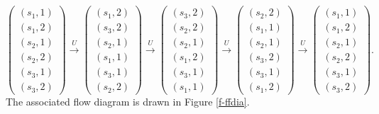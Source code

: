 $$
\left(
\begin{array}{c}
(s_1,1)                \\
(s_1,2)                \\
(s_2,1)                \\
(s_2,2)                \\
(s_3,1)                \\
(s_3,2)
\end{array}
\right)
\stackrel{U}{\longrightarrow }
\left(
\begin{array}{c}
(s_1,2)                \\
(s_3,2)                \\
(s_2,1)                \\
(s_1,1)                \\
(s_3,1)                \\
(s_2,2)
\end{array}
\right)
\stackrel{U}{\longrightarrow }
\left(
\begin{array}{c}
(s_3,2)                \\
(s_2,2)                \\
(s_2,1)                \\
(s_1,2)                \\
(s_3,1)                \\
(s_1,1)
\end{array}
\right)
\stackrel{U}{\longrightarrow }
\left(
\begin{array}{c}
(s_2,2)                \\
(s_1,1)                \\
(s_2,1)                \\
(s_3,2)                \\
(s_3,1)                \\
(s_1,2)
\end{array}
\right)
\stackrel{U}{\longrightarrow }
\left(
\begin{array}{c}
(s_1,1)                \\
(s_1,2)                \\
(s_2,1)                \\
(s_2,2)                \\
(s_3,1)                \\
(s_3,2)
\end{array}
\right).
  $$
The associated flow diagram is drawn in Figure \ref{f-ffdia}.
